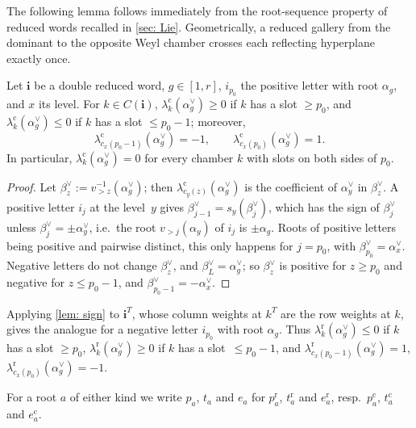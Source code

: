 \documentclass[a4paper]{amsart}
\numberwithin{equation}{section}
\theoremstyle{definition}
\theoremstyle{remark}
\newcommand{\bfi}{\mathbf{i}}
\newcommand{\rr}{\mathrm{r}}
\newcommand{\cc}{\mathrm{c}}
\begin{document}
The following lemma follows immediately from the root-sequence property of reduced words recalled in \cref{sec: Lie}.
Geometrically, a reduced gallery from the dominant to the opposite Weyl chamber crosses each reflecting hyperplane exactly once.

\begin{lemma}
  \label{lem: sign}
  Let $\bfi$ be a double reduced word, $g\in[1,r]$, $i_{p_0}$ the positive letter with root $\alpha_g$, and $x$ its level.
  For $k\in C(\bfi)$, $\lambda^\cc_k(\alpha_g^\vee)\ge0$ if $k$ has a slot $\ge p_0$, and $\lambda^\cc_k(\alpha_g^\vee)\le0$ if $k$ has a slot $\le p_0-1$; moreover,
  \[
    \lambda^\cc_{c_x(p_0-1)}(\alpha_g^\vee)=-1,
    \qquad \lambda^\cc_{c_x(p_0)}(\alpha_g^\vee)=1.
  \]
  In particular, $\lambda^\cc_k(\alpha_g^\vee)=0$ for every chamber $k$ with slots on both sides of $p_0$.
\end{lemma}
\begin{proof}

  Let $\beta^\vee_z:=v_{>z}^{-1}(\alpha_g^\vee)$; then $\lambda^\cc_{c_y(z)}(\alpha_g^\vee)$ is the coefficient of $\alpha_y^\vee$ in $\beta^\vee_z$.
  A positive letter $i_j$ at the level~$y$ gives $\beta^\vee_{j-1}=s_y(\beta^\vee_j)$, which has the sign of $\beta^\vee_j$ unless $\beta^\vee_j=\pm\alpha_y^\vee$, i.e.\ the root $v_{>j}(\alpha_y)$ of $i_j$ is $\pm\alpha_g$.
  Roots of positive letters being positive and pairwise distinct, this only happens for $j=p_0$, with $\beta^\vee_{p_0}=\alpha_x^\vee$.
  Negative letters do not change $\beta^\vee_z$, and $\beta^\vee_L=\alpha_g^\vee$; so $\beta^\vee_z$ is positive for $z\ge p_0$ and negative for $z\le p_0-1$, and $\beta^\vee_{p_0-1}=-\alpha_x^\vee$.
\end{proof}
Applying \cref{lem: sign} to $\bfi^T$, whose column weights at $k^T$ are the row weights at $k$, gives the analogue for a negative letter $i_{p_0}$ with root $\alpha_g$.
Thus $\lambda^\rr_k(\alpha_g^\vee)\le0$ if $k$ has a slot $\ge p_0$, $\lambda^\rr_k(\alpha_g^\vee)\ge0$ if $k$ has a slot~$\le p_0-1$, and $\lambda^\rr_{c_x(p_0-1)}(\alpha_g^\vee)=1$, $\lambda^\rr_{c_x(p_0)}(\alpha_g^\vee)=-1$.

For a root $a$ of either kind we write $p_a$, $t_a$ and $e_a$ for $p^\rr_a$, $t^\rr_a$ and $e^\rr_a$, resp.\ $p^\cc_a$, $t^\cc_a$ and $e^\cc_a$.
\end{document}
